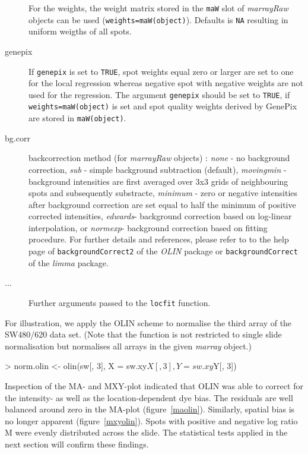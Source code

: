 \documentclass[a4paper,11pt]{article}
\begin{document}
\begin{description}
                          For the weights, the weight matrix stored 
                          in the \texttt{maW} slot of  \emph{marrayRaw} objects can be used 
                           (\texttt{weights=maW(object)}). Defaults is \texttt{NA} resulting
                          in uniform weigths of all spots. 
	\item[genepix]{If \texttt{genepix} is set to 
			\texttt{TRUE},  spot weights equal zero or larger are set
			to one for the local regression whereas negative
			spot with negative weights are not used   for the
			regression. The argument \texttt{genepix} should
			be set to \texttt{TRUE}, if
			\texttt{weights=maW(object)} is set and  spot
			quality weights derived by GenePix are stored in
			\texttt{maW(object)}.}
            \item[bg.corr] backcorrection method (for \emph{marrayRaw} objects)  :
			\emph{none} - no background correction, \emph{sub} 
                          - simple background subtraction (default), 
            \emph{movingmin} -  background intensities are first averaged over 3x3 grids
  of neighbouring spots and subsequently substracte, 
 \emph{minimum} - zero or negative intensities after background
        correction are set equal to half the minimum of positive
        corrected intensities, \emph{edwards}-  background correction based on  log-linear
       interpolation, or \emph{normexp}-  background correction based on fitting
       procedure. For further details and references, please refer to to the  help page
of \texttt{backgroundCorrect2} of the \emph{OLIN} package or \texttt{backgroundCorrect} of the \emph{limma} package.
 

          \item[...] Further arguments passed to the  \texttt{locfit} function.	
      \end{description}


For illustration, we apply the OLIN scheme to normalise the third array of the SW480/620 data set. 
(Note that the function is not restricted to single slide normalisation but normalises all arrays
in the given \emph{marray} object.)

\begin{Schunk}
\begin{Sinput}
> norm.olin <- olin(sw[, 3], X = sw.xy$X[, 3], Y = sw.xy$Y[, 3])
\end{Sinput}
\end{Schunk}

Inspection of the MA- and MXY-plot indicated that OLIN  was able to correct for the  
intensity- as well as  the  location-dependent dye bias. The
 residuals are well  balanced around zero in the MA-plot (figure~\ref{maolin}).
Similarly, spatial bias is no longer apparent (figure~\ref{mxyolin}).
Spots with positive and negative log ratio M were evenly distributed across the slide. 
The statistical tests
applied in the next section will confirm  these findings. 
\end{document}
